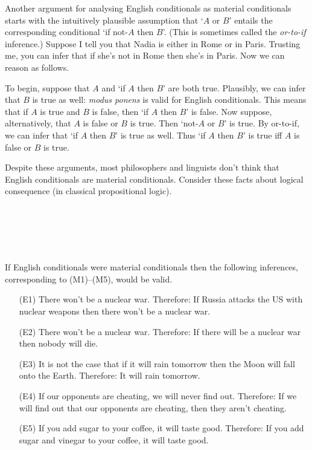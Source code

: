 Another argument for analysing English conditionals as material conditionals
starts with the intuitively plausible assumption that `$A$ or $B$' entails the
corresponding conditional `if not-$A$ then $B$'. (This is sometimes called the
\emph{or-to-if} inference.) Suppose I tell you that Nadia is either in Rome or
in Paris. Trusting me, you can infer that if she's not in Rome then she's in
Paris. Now we can reason as follows.

To begin, suppose that $A$ and `if $A$ then $B$' are both true. Plausibly, we
can infer that $B$ is true as well: \emph{modus ponens} is valid for English
conditionals. \label{p:mp} This means that if $A$ is true and $B$ is false, then
`if $A$ then $B$' is false. Now suppose, alternatively, that $A$ is false or $B$
is true. Then `not-$A$ or $B$' is true. By or-to-if, we can infer that `if $A$
then $B$' is true as well. Thus `if $A$ then $B$' is true iff $A$ is false or
$B$ is true.

Despite these arguments, most philosophers and linguists don't think that
English conditionals are material conditionals. Consider these facts about
logical consequence (in classical propositional logic).
%
\label{paradoxes-mat-imp}
\begin{principles}
\\
\\
\\
\\
\end{principles}

If English conditionals were material conditionals then the following
inferences, corresponding to (M1)--(M5), would be valid.

\begin{enumerate}[leftmargin=12mm]
  \itemsep1mm
  \item[(E1)] There won't be a nuclear war. Therefore: If Russia attacks the US
        with nuclear weapons then there won't be a nuclear war.
  \item[(E2)] There won't be a nuclear war. Therefore: If there will be a
        nuclear war then nobody will die.
  \item[(E3)] It is not the case that if it will rain tomorrow then the Moon
        will fall onto the Earth. Therefore: It will rain tomorrow.
  \item[(E4)] If our opponents are cheating, we will never find out. Therefore:
        If we will find out that our opponents are cheating, then they aren't
        cheating.
  \item[(E5)] If you add sugar to your coffee, it will taste good. Therefore: If
        you add sugar and vinegar to your coffee, it will taste good.
\end{enumerate}

